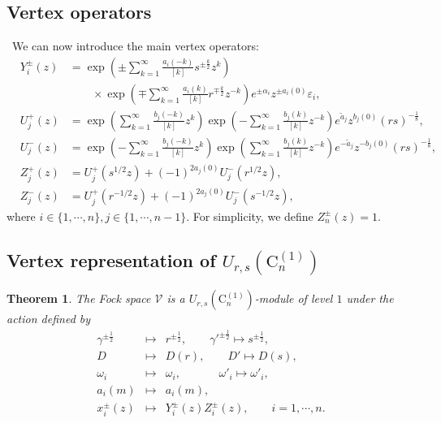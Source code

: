 \documentclass{amsproc}
\newtheorem{theo}{Theorem}[section]
\theoremstyle{remark}
\numberwithin{equation}{section}
\begin{document}
\subsection{Vertex operators}\, We can now introduce the main vertex operators:
\begin{eqnarray*}
&Y_i^{\pm}(z)&=
         \exp (\pm  \sum^{\infty}_{k=1}
                 \frac{a_i(-k)}{[k]} s^{\pm\frac{k}{2}} z^k)\\
    &&\qquad     \times\exp ( \mp \sum^{\infty}_{k=1}
           \frac{a_i(k)   }{[k]} r^{\mp \frac{k}{2}} z^{-k})
         e^{\pm{\alpha}_i} z^{\pm a_i(0)}{\varepsilon}_i ,\\
  
               
    
       
      
&U_j^+(z)&=
         \exp ( \sum^{\infty}_{k=1}
                 \frac{b_j(-k)}{[k]}z^k)
         \exp ( - \sum^{\infty}_{k=1}
           \frac{b_j(k)   }{[k]}z^{-k})
         e^{ \tilde{a}_j} z^{ b_j(0)}(rs)^{-\frac{1}{8}},\\
&U_j^-(z)&=
         \exp (-\sum^{\infty}_{k=1}
                 \frac{b_j(-k)}{[k]}z^k)
         \exp (\sum^{\infty}_{k=1}
           \frac{b_j(k)   }{[k]}  z^{-k})
         e^{-\tilde{a}_j} z^{- b_j(0)}(rs)^{-\frac{1}{8}},\\
&Z^{+}_j(z)&=U_j^+(s^{1/2}z)+(-1)^{2a_j(0)}U_j^-(r^{1/2}z),\\
&Z^{-}_j(z)&=U_j^+(r^{-1/2}z)+(-1)^{2a_j(0)}U_j^-(s^{-1/2}z),
\end{eqnarray*}
where $i\in\{1, \cdots, n\}, j\in\{1, \cdots, n-1\}$. For simplicity,
we define $Z_n^{\pm}(z)=1$.

\subsection{Vertex representation of $U_{r,s}(\mathrm{C}_n^{(1)})$}

\begin{theo} \label{T:1} The Fock space
    $\mathcal{V}$ is a $U_{r,s}(\mathrm{C}_n^{(1)})$-module of level $1$
    under the action defined by
\begin{eqnarray*}
\gamma^{\pm\frac1{2}}&\mapsto& r^{\pm\frac1{2}},\qquad \gamma'^{\pm\frac1{2}}\mapsto s^{\pm\frac1{2}},\\
D &\mapsto& D(r),\qquad
D'\mapsto D(s),\\
\omega_i&\mapsto & \omega_i,\qquad\quad\,\,
\omega'_i\mapsto  \omega'_i,\\
 a_{i}(m) &\longmapsto& a_i(m),\\
x_i^{\pm}(z) &\longmapsto&
             Y_i^{\pm}(z)Z_i^{\pm}(z),  \qquad i=1, \cdots, n.
\end{eqnarray*}
\end{theo}
\end{document}

